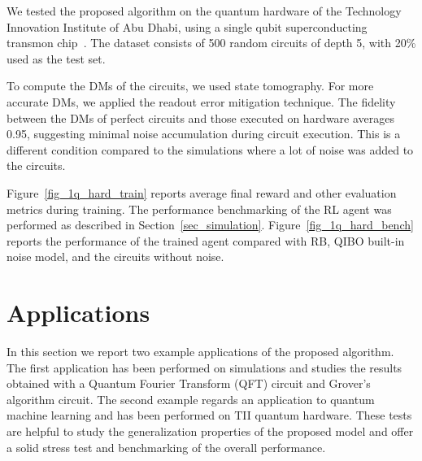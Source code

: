 \documentclass[referee,sn-basic]{sn-jnl} %
\begin{document}
We tested the proposed algorithm on the quantum hardware of the Technology Innovation Institute of Abu Dhabi, 
using a single qubit superconducting transmon chip~\cite{doi:10.1126/science.1231930}. The dataset consists 
of 500 random circuits of depth 5, with 20\% used as the test set. 

To compute the DMs of the circuits, we used state tomography. For more accurate DMs, we applied the readout 
error mitigation technique. The fidelity between the DMs of perfect circuits and those executed on hardware 
averages 0.95, suggesting minimal noise accumulation during circuit execution. This is a different condition 
compared to the simulations where a lot of noise was added to the circuits. 

Figure~\ref{fig_1q_hard_train} reports average final reward and other evaluation metrics during training. 
The performance benchmarking of the RL agent was performed as described in Section~\ref{sec_simulation}. 
Figure~\ref{fig_1q_hard_bench} reports the performance of the trained agent compared with RB, QIBO built-in 
noise model, and the circuits without noise.
\newpage
\section{Applications} \label{sec_applications}
In this section we report two example applications of the proposed algorithm. The first application has been performed on simulations and studies the results obtained with a Quantum Fourier Transform (QFT) circuit and Grover's algorithm circuit. The second example regards an application to quantum machine learning and has been performed on TII quantum hardware. These tests are helpful to study the generalization properties of the proposed model and offer a solid stress test and benchmarking of the overall performance.
\end{document}
